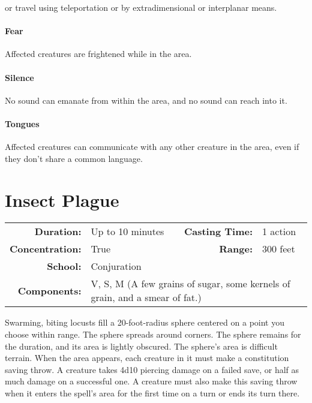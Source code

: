 \documentclass[a5paper, 12pt]{memoir}
\begin{document}
or travel using teleportation or by extradimensional or interplanar means. \paragraph{Fear} Affected creatures are frightened while in the area. \paragraph{Silence} No sound can emanate from within the area, and no sound can reach into it. \paragraph{Tongues} Affected creatures can communicate with any other creature in the area, even if they don't share a common language.

\newpage
\section*{Insect Plague}

{
\small\centering\vspace{-6pt}
\begin{tabular}{rlrl}
\toprule

\textbf{Duration:} & Up to 10 minutes &
\textbf{Casting Time:} & 1 action \\
\textbf{Concentration:} & True &
\textbf{Range:} & 300 feet \\
\textbf{School:} & Conjuration \\
\textbf{Components:} & \multicolumn{3}{p{0.7\textwidth}}{V, S, M (A few grains of sugar, some kernels of grain, and a smear of fat.)}\\

\bottomrule
\end{tabular}
}

\vspace{1\baselineskip}\noindent Swarming, biting locusts fill a 20-foot-radius sphere centered on a point you choose within range. The sphere spreads around corners. The sphere remains for the duration, and its area is lightly obscured. The sphere's area is difficult terrain. When the area appears, each creature in it must make a constitution saving throw. A creature takes 4d10 piercing damage on a failed save, or half as much damage on a successful one. A creature must also make this saving throw when it enters the spell's area for the first time on a turn or ends its turn there.
\end{document}
